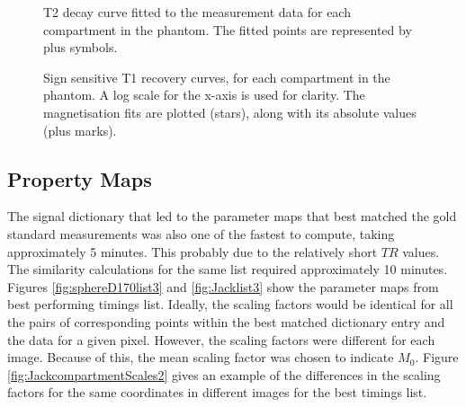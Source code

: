 \documentclass[journal]{IEEEtran}
\newlength\figureheight
\newlength\figurewidth
\begin{document}
\begin{figure}
\centering
\begin{minipage}[c]{\columnwidth}
\setlength{}
\setlength{}



    \caption{T2 decay curve fitted to the measurement data for each compartment in the phantom. The fitted points are represented by plus symbols.}
    \label{fig:JackT2fitALL}
\end{minipage}
\end{figure}

\begin{figure}
\centering
\begin{minipage}[c]{\columnwidth}
\setlength{}
\setlength{}



    \caption{Sign sensitive T1 recovery curves, for each compartment in the phantom. A log scale for the x-axis is used for clarity. The magnetisation fits are plotted (stars), along with its absolute values (plus marks). }
    \label{fig:JackT1fitALL}
\end{minipage}
\end{figure}

\subsection{Property Maps}
The signal dictionary that led to the parameter maps that best matched the gold standard measurements was also one of the fastest to compute, taking approximately 5 minutes. This probably due to the relatively short $TR$ values. The similarity calculations for the same list required approximately 10 minutes.
Figures \ref{fig:sphereD170list3} and \ref{fig:Jacklist3} show the parameter maps from best performing timings list.
 Ideally, the scaling factors would be identical for all the pairs of corresponding points within the best matched dictionary entry and the data for a given pixel. However, the scaling factors were different for each image. Because of this, the mean scaling factor was chosen to indicate $M_0$. Figure \ref{fig:JackcompartmentScales2} gives an example of the differences in the scaling factors for the same coordinates in different images for the best timings list.
\end{document}

